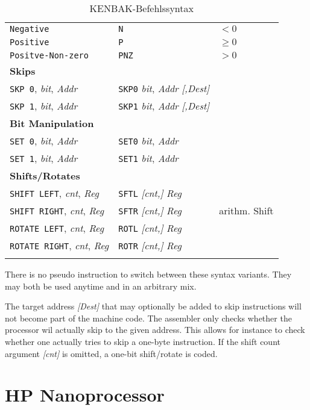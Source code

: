 \documentclass[12pt,twoside]{report}
\begin{document}
\begin{center}
\begin{longtable}{|l|l|l|}
{\tt Negative} & {\tt N} & $< 0$ \\
{\tt Positive} & {\tt P} & $\geq 0$ \\
{\tt Positve-Non-zero} & {\tt PNZ} & $ > 0$ \\
\hline
\multicolumn{3}{|l|}{\bf Skips} \\
\hline
{\tt SKP 0}, {\it bit}, {\it Addr} & {\tt SKP0} {\it bit}, {\it Addr} {\it [,Dest]} & \\
{\tt SKP 1}, {\it bit}, {\it Addr} & {\tt SKP1} {\it bit}, {\it Addr} {\it [,Dest]} & \\
\hline
\multicolumn{3}{|l|}{\bf Bit Manipulation} \\
\hline
{\tt SET 0}, {\it bit}, {\it Addr} & {\tt SET0} {\it bit}, {\it Addr} & \\
{\tt SET 1}, {\it bit}, {\it Addr} & {\tt SET1} {\it bit}, {\it Addr} & \\
\hline
\multicolumn{3}{|l|}{\bf Shifts/Rotates} \\
\hline
{\tt SHIFT LEFT}, {\it cnt}, {\it Reg} & {\tt SFTL} {\it [cnt,]} {\it Reg} & \\
{\tt SHIFT RIGHT}, {\it cnt}, {\it Reg} & {\tt SFTR} {\it [cnt,]} {\it Reg} & arithm. Shift \\
{\tt ROTATE LEFT}, {\it cnt}, {\it Reg} & {\tt ROTL} {\it [cnt,]} {\it Reg} & \\
{\tt ROTATE RIGHT}, {\it cnt}, {\it Reg} & {\tt ROTR} {\it [cnt,]} {\it Reg} & \\
\hline
\caption{KENBAK-Befehlssyntax \label{TabKENBAKSyntax}}
\end{longtable}\end{center}
\hfuzz=0pt

There is no pseudo instruction to switch between these syntax variants.  They may
both be used anytime and in an arbitrary mix.

The target address {\it [Dest]} that may optionally be added to skip instructions
will not become part of the machine code.  The assembler only checks whether the
processor wil actually skip to the given address.  This allows for instance to check
whether one actually tries to skip a one-byte instruction.  If the shift count
argument {\it [cnt]} is omitted, a one-bit shift/rotate is coded.


\section{HP Nanoprocessor}
\end{document}
